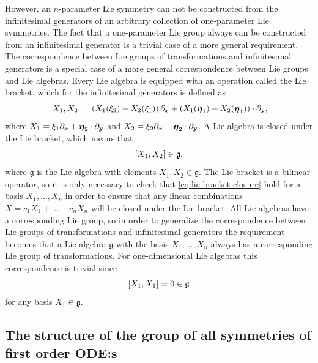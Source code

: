 However, an \(n\)-parameter Lie symmetry can not be constructed from the infinitesimal generators of an arbitrary collection of one-parameter Lie symmetries.
The fact that a one-parameter Lie group always can be constructed from an infinitesimal generator is a trivial case of a more general requirement.
The correspondence between Lie groups of transformations and infinitesimal generators is a special case of a more general correspondence between Lie groups and Lie algebras.
Every Lie algebra is equipped with an operation called the Lie bracket, which for the infinitesimal generators is defined as
\begin{equation} \label{eq:lie-bracket}
  \comm{X_1}{X_2} = \left(X_1(\xi_2) - X_2(\xi_1)\right) \partial_x + \left(X_1(\vb*{\eta}_1) - X_2(\vb*{\eta}_1)\right) \cdot \partial_{\vb{y}},
\end{equation}
where \(X_1 = \xi_1 \partial_x + \vb*{\eta}_2 \cdot \partial_{\vb{y}}\) and \(X_2 = \xi_2 \partial_x + \vb*{\eta}_2 \cdot \partial_{\vb{y}}\).
A Lie algebra is closed under the Lie bracket, which means that
\begin{equation} \label{eq:lie-bracket-closure}
  \comm{X_1}{X_2} \in \mathfrak{g},
\end{equation}
where \(\mathfrak{g}\) is the Lie algebra with elements \(X_1, X_2 \in \mathfrak{g}\).
The Lie bracket is a bilinear operator, so it is only necessary to check that \cref{eq:lie-bracket-closure} hold for a basis \(X_1, \dots, X_n\) in order to ensure that any linear combinations \(X = c_1 X_1 + \dots + c_n X_n\) will be closed under the Lie bracket.
All Lie algebras have a corresponding Lie group, so in order to generalize the correspondence between Lie groups of transformations and infinitesimal generators the requirement becomes that a Lie algebra \(\mathfrak{g}\) with the basis \(X_1, \dots, X_n\) always has a corresponding Lie group of transformations.
For one-dimensional Lie algebras this correspondence is trivial since
\begin{equation}
  \comm{X_1}{X_1} = 0 \in \mathfrak{g}
\end{equation}
for any basis \(X_1 \in \mathfrak{g}\).

\subsection{The structure of the group of all symmetries of first order ODE:s}

